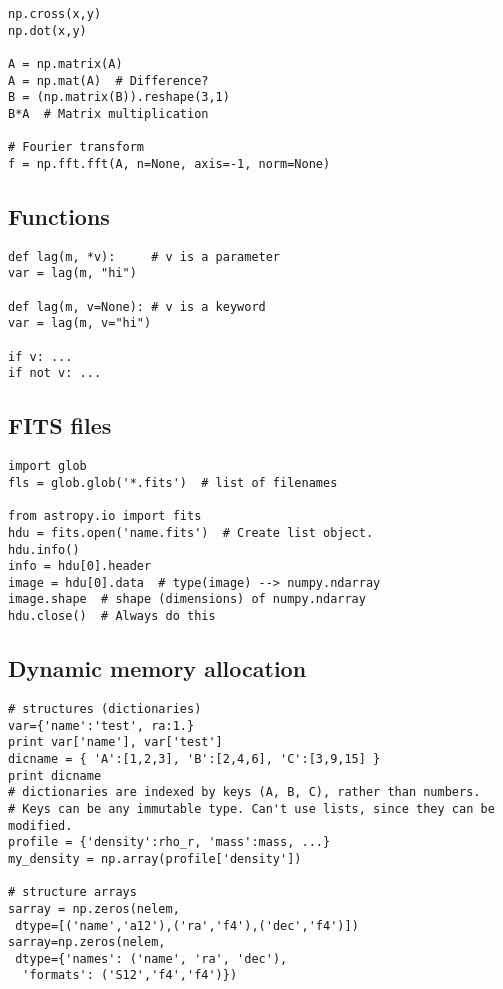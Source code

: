 \documentclass{article}
\begin{document}
\begin{multicols}{2}
\begin{lstlisting}
np.cross(x,y)
np.dot(x,y)

A = np.matrix(A)
A = np.mat(A)  # Difference?
B = (np.matrix(B)).reshape(3,1)
B*A  # Matrix multiplication

# Fourier transform
f = np.fft.fft(A, n=None, axis=-1, norm=None)
\end{lstlisting}

\subsection{Functions}
\begin{lstlisting}
def lag(m, *v):     # v is a parameter
var = lag(m, "hi")

def lag(m, v=None): # v is a keyword
var = lag(m, v="hi")

if v: ...
if not v: ...
\end{lstlisting}
\columnbreak


\subsection{FITS files}
\begin{lstlisting}
import glob
fls = glob.glob('*.fits')  # list of filenames

from astropy.io import fits
hdu = fits.open('name.fits')  # Create list object.
hdu.info()
info = hdu[0].header
image = hdu[0].data  # type(image) --> numpy.ndarray
image.shape  # shape (dimensions) of numpy.ndarray
hdu.close()  # Always do this
\end{lstlisting}

\subsection{Dynamic memory allocation}
\begin{lstlisting}
# structures (dictionaries)
var={'name':'test', ra:1.}
print var['name'], var['test']
dicname = { 'A':[1,2,3], 'B':[2,4,6], 'C':[3,9,15] }
print dicname
# dictionaries are indexed by keys (A, B, C), rather than numbers.
# Keys can be any immutable type. Can't use lists, since they can be modified.
profile = {'density':rho_r, 'mass':mass, ...}
my_density = np.array(profile['density'])

# structure arrays
sarray = np.zeros(nelem,
 dtype=[('name','a12'),('ra','f4'),('dec','f4')])
sarray=np.zeros(nelem,
 dtype={'names': ('name', 'ra', 'dec'),
  'formats': ('S12','f4','f4')})
\end{lstlisting}


\end{multicols}
\end{document}
